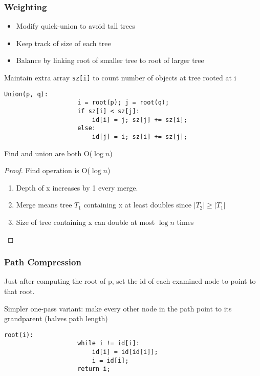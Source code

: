 \documentclass[11pt]{article}
\begin{document}
		\subsubsection{Weighting}
			\begin{itemize}
				\item Modify quick-union to avoid tall trees
				\item Keep track of size of each tree
				\item Balance by linking root of smaller tree to root of larger tree
			\end{itemize}
			Maintain extra array \verb|sz[i]| to count number of objects at tree rooted at i
			\begin{lstlisting}[autogobble=true]
				Union(p, q):
					i = root(p); j = root(q);
					if sz[i] < sz[j]:
						id[i] = j; sz[j] += sz[i];
					else:
						id[j] = i; sz[i] += sz[j];
			\end{lstlisting}
			Find and union are both O($\log n$)
			
			\begin{proof}
			Find operation is O($\log n$)
				\begin{enumerate}
					\item Depth of x increases by 1 every merge.
					\item Merge means tree $T_1$ containing x at least doubles since $|T_2| \geq |T_1|$
					\item Size of tree containing x can double at most $\log n$ times
				\end{enumerate}
			\end{proof}
		
		\subsubsection{Path Compression}
		
			Just after computing the root of p, set the id of each examined node to point to that root.
			
			Simpler one-pass variant: make every other node in the path point to its grandparent (halves path length)
			
			\begin{lstlisting}[autogobble=true]
				root(i):
					while i != id[i]:
						id[i] = id[id[i]];
						i = id[i];
					return i;
			\end{lstlisting}
			
\end{document}
